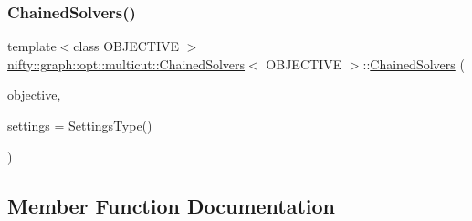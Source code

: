 \mbox{\label{classnifty_1_1graph_1_1opt_1_1multicut_1_1ChainedSolvers_addd0fb2e11bb42fdf100b506675008dc}} 
\subsubsection{\texorpdfstring{Chained\+Solvers()}{ChainedSolvers()}}
{\footnotesize\ttfamily template$<$class O\+B\+J\+E\+C\+T\+I\+VE $>$ \\
\hyperlink{classnifty_1_1graph_1_1opt_1_1multicut_1_1ChainedSolvers}{nifty\+::graph\+::opt\+::multicut\+::\+Chained\+Solvers}$<$ O\+B\+J\+E\+C\+T\+I\+VE $>$\+::\hyperlink{classnifty_1_1graph_1_1opt_1_1multicut_1_1ChainedSolvers}{Chained\+Solvers} (\begin{DoxyParamCaption}\item[{const \hyperlink{classnifty_1_1graph_1_1opt_1_1multicut_1_1ChainedSolvers_a4d9fa96d1a27a875c036b01bf547c1d0}{Objective\+Type} \&}]{objective,  }\item[{const \hyperlink{structnifty_1_1graph_1_1opt_1_1multicut_1_1ChainedSolvers_1_1SettingsType}{Settings\+Type} \&}]{settings = {\ttfamily \hyperlink{structnifty_1_1graph_1_1opt_1_1multicut_1_1ChainedSolvers_1_1SettingsType}{Settings\+Type}()} }\end{DoxyParamCaption})}



\subsection{Member Function Documentation}
\mbox{\label{classnifty_1_1graph_1_1opt_1_1multicut_1_1ChainedSolvers_ad62c0b4a0b11f70020c9e668013aae6a}} 
